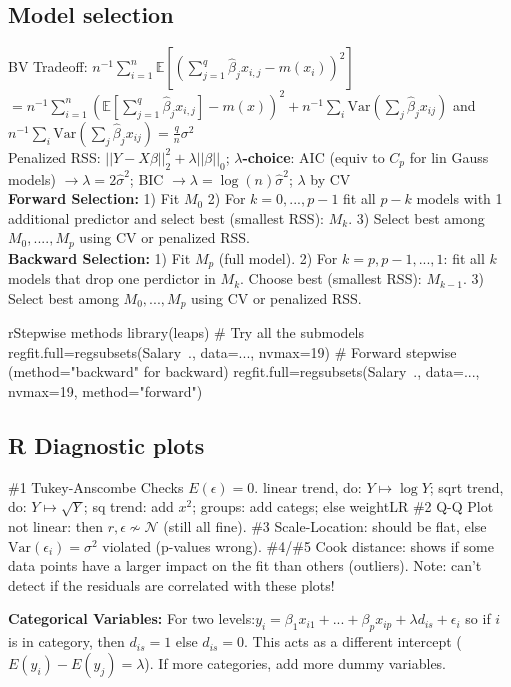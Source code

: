\subsection*{Model selection$\;\;$}

BV Tradeoff:
$n^{-1}\sum_{i=1}^n\mathbb{E} \left[ \left( \sum_{j=1}^q \hat{\beta}_j x_{i,j} - m(x_i) \right) ^2 \right]$
$=  n^{-1} \sum_{i=1}^n \left( \mathbb{E}[\sum_{j=1}^q\hat{\beta}_j x_{i, j}] - m(x) \right)^2 + n^{-1}\sum_i \text{Var}(\sum_j \hat{\beta}_j x_{ij})$ and
$n^{-1}\sum_i \text{Var}(\sum_j \hat{\beta}_j x_{ij})=\frac{q}{n} \sigma^2$
\\
Penalized RSS: $||Y - X\beta||^2_2 + \lambda ||\beta||_0$;
\textbf{$\lambda$-choice}: AIC (equiv to $C_p$ for lin Gauss models) $\rightarrow \lambda=2\hat{\sigma}^2$; BIC $\rightarrow \lambda=\log(n)\hat{\sigma}^2$; $\lambda$ by CV
\\
\textbf{Forward Selection:} 1) Fit $M_0$ 2) For $k=0,...,p-1$ fit all $p-k$ models with 1 additional predictor and select best (smallest RSS): $M_k$. 3) Select best among $M_0,....,M_p$ using CV or penalized RSS. \\
\textbf{Backward Selection:} 1) Fit $M_p$ (full model). 2) For $k=p,p-1,...,1$: fit all $k$ models that drop one perdictor in $M_k$. Choose best (smallest RSS): $M_{k-1}$. 3) Select best among $M_0,...,M_p$ using CV or penalized RSS.
\begin{codebox}{r}{Stepwise methods}
library(leaps)
# Try all the submodels
regfit.full=regsubsets(Salary~., data=..., nvmax=19)
# Forward stepwise (method="backward" for backward)
regfit.full=regsubsets(Salary~., data=..., nvmax=19, method="forward")
\end{codebox}

\subsection*{R Diagnostic plots} \#1 Tukey-Anscombe Checks $E(\epsilon)=0$.
linear trend, do: $Y\mapsto\log Y$; sqrt trend, do: $Y\mapsto\sqrt{Y}$; sq trend: add $x^2$; groups: add categs; else weightLR
\#2 Q-Q Plot not linear: then $r,\epsilon\nsim\mathcal{N}$ (still all fine). \#3 Scale-Location: should be flat, else $\text{Var}(\epsilon_i)=\sigma^2$ violated (p-values wrong). \#4/\#5 Cook distance: shows if some data points have a larger impact on the fit than others (outliers). Note: can't detect if the residuals are correlated with these plots!

\textbf{Categorical Variables:} 
For two levels:$y_i = \beta_1 x_{i1}+...+\beta_p x_{ip} + \lambda d_{is} + \epsilon_i$ 
so if $i$ is in category, then $d_{is}=1$ else $d_{is}=0$. This acts as a different intercept ($E(y_i)-E(y_j)=\lambda$). If more categories, add more dummy variables.

